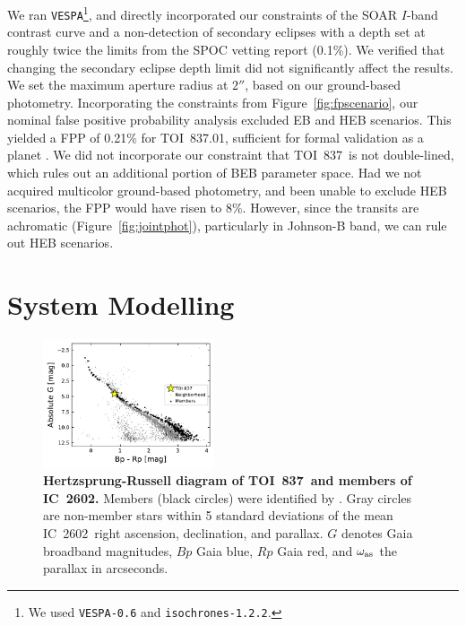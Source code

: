\documentclass[12pt,twocolumn,tighten]{aastex63}
\newcommand{\tn}{TOI~837} %
\newcommand{\pn}{TOI~837.01} %
\newcommand{\cn}{IC~2602} %
\begin{document}
We ran \texttt{VESPA}\footnote{We used
\texttt{VESPA-0.6} and \texttt{isochrones-1.2.2}.}, and directly
incorporated our constraints of the SOAR $I$-band contrast curve and a
non-detection of secondary eclipses with a depth set at roughly twice
the limits from the SPOC vetting report (0.1\%).  We verified that
changing the secondary eclipse depth limit did not significantly
affect the results.  We set the maximum aperture radius at $2''$,
based on our ground-based photometry.  Incorporating the constraints
from Figure~\ref{fig:fpscenario}, our nominal false positive
probability analysis excluded EB and HEB scenarios.  This yielded a
FPP of 0.21\% for \pn, sufficient for formal validation as a
planet \citep{morton_efficient_2012}.  We did not incorporate our constraint that \tn\ is not
double-lined, which rules out an additional portion of BEB parameter
space.  Had we not acquired multicolor ground-based photometry, and
been unable to exclude HEB scenarios, the FPP would have risen to 8\%.
However, since the transits are achromatic
(Figure~\ref{fig:jointphot}), particularly in Johnson-B band, we can
rule out HEB scenarios.


\section{System Modelling}
\label{sec:system}

\begin{figure}[!t]
	\begin{center}
		\leavevmode
		\includegraphics[width=0.45\textwidth]{f7.pdf}
	\end{center}
	\vspace{-0.7cm}
	\caption{ 
  {\bf Hertzsprung-Russell diagram of \tn\ and members of \cn.}
  Members (black circles) were identified by
  \citet{cantatgaudin_gaia_2018}.  Gray circles are non-member stars
  within 5 standard deviations of the mean \cn\ right ascension,
  declination, and parallax.  $G$ denotes Gaia broadband magnitudes,
  $Bp$ Gaia blue, $Rp$ Gaia red, and $\omega_{\rm as}$ the parallax in
  arcseconds. 
  \label{fig:hr}
	}
\end{figure}
\end{document}
